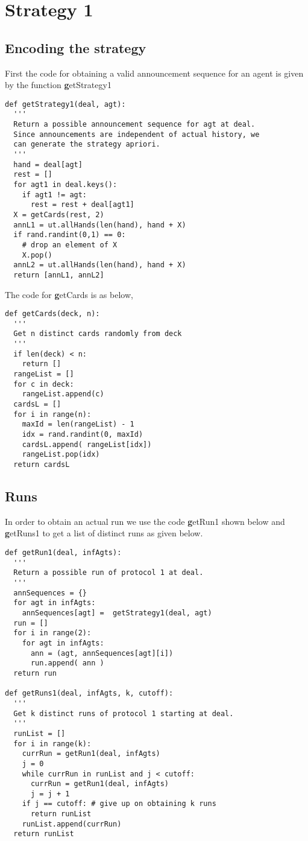 \section{Strategy 1}

\subsection{Encoding the strategy}

First the code for obtaining a valid
announcement sequence for an agent is given by
the function {\textbf \textrm getStrategy1}

\begin{verbatim}
def getStrategy1(deal, agt):
  '''
  Return a possible announcement sequence for agt at deal.
  Since announcements are independent of actual history, we
  can generate the strategy apriori.
  '''
  hand = deal[agt]
  rest = []
  for agt1 in deal.keys():
    if agt1 != agt:
      rest = rest + deal[agt1]
  X = getCards(rest, 2)
  annL1 = ut.allHands(len(hand), hand + X)
  if rand.randint(0,1) == 0:
    # drop an element of X
    X.pop()
  annL2 = ut.allHands(len(hand), hand + X)
  return [annL1, annL2]
\end{verbatim}

The code for {\textbf getCards} is as below,

\begin{verbatim}
def getCards(deck, n):
  '''
  Get n distinct cards randomly from deck
  '''
  if len(deck) < n:
    return []
  rangeList = []
  for c in deck:
    rangeList.append(c)
  cardsL = []
  for i in range(n):
    maxId = len(rangeList) - 1
    idx = rand.randint(0, maxId)
    cardsL.append( rangeList[idx])
    rangeList.pop(idx)
  return cardsL
\end{verbatim}

\subsection{Runs}

In order to obtain an actual run we use the code
{\textbf \textrm getRun1} shown below and
{\textbf \textrm getRuns1} to get a list of
distinct runs as given below.

\begin{verbatim}
def getRun1(deal, infAgts):
  '''
  Return a possible run of protocol 1 at deal.
  '''
  annSequences = {}
  for agt in infAgts:
    annSequences[agt] =  getStrategy1(deal, agt)
  run = []
  for i in range(2):
    for agt in infAgts:
      ann = (agt, annSequences[agt][i])
      run.append( ann )
  return run

def getRuns1(deal, infAgts, k, cutoff):
  '''
  Get k distinct runs of protocol 1 starting at deal.
  '''
  runList = []
  for i in range(k):
    currRun = getRun1(deal, infAgts)
    j = 0
    while currRun in runList and j < cutoff:
      currRun = getRun1(deal, infAgts)
      j = j + 1
    if j == cutoff: # give up on obtaining k runs
      return runList
    runList.append(currRun)
  return runList
\end{verbatim}

